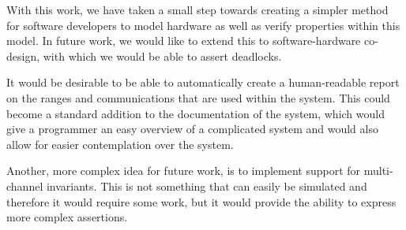With this work, we have taken a small step towards creating a simpler method for software developers to model hardware as well as verify properties within this model. In future work, we would like to extend this to software-hardware co-design, with which we would be able to assert deadlocks.

It would be desirable to be able to automatically create a human-readable report on the ranges and communications that are used within the system. This could become a standard addition to the documentation of the system, which would give a programmer an easy overview of a complicated system and would also allow for easier contemplation over the system.

Another, more complex idea for future work, is to implement support for multi-channel invariants. This is not something that can easily be simulated and therefore it would require some work, but it would provide the ability to express more complex assertions.